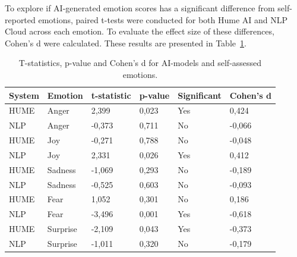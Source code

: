 To explore if AI-generated emotion scores has a significant difference from self-reported emotions, paired t-tests were conducted for both Hume AI and NLP Cloud across each emotion. 
To evaluate the effect size of these differences, Cohen's d were calculated. These results are presented in Table~\ref{tab:t-test-rq3}.
\begin{table}[!h]
    \centering
    \begin{tabular}{l|lllll}
    \textbf{System} & \textbf{Emotion} & \textbf{t-statistic} & \textbf{p-value} & \textbf{Significant} & \textbf{Cohen's d} \\ \hline
    HUME            & Anger            & 2,399                & 0,023            & Yes                  & 0,424              \\
    NLP             & Anger            & -0,373               & 0,711            & No                   & -0,066             \\
    HUME            & Joy              & -0,271               & 0,788            & No                   & -0,048             \\
    NLP             & Joy              & 2,331                & 0,026            & Yes                  & 0,412              \\
    HUME            & Sadness          & -1,069               & 0,293            & No                   & -0,189             \\
    NLP             & Sadness          & -0,525               & 0,603            & No                   & -0,093             \\
    HUME            & Fear             & 1,052                & 0,301            & No                   & 0,186              \\
    NLP             & Fear             & -3,496               & 0,001            & Yes                  & -0,618             \\
    HUME            & Surprise         & -2,109               & 0,043            & Yes                  & -0,373             \\
    NLP             & Surprise         & -1,011               & 0,320            & No                   & -0,179            
    \end{tabular}
    \caption{T-statistics, p-value and Cohen's d for AI-models and self-assessed emotions.}
    \label{tab:t-test-rq3}
\end{table}

